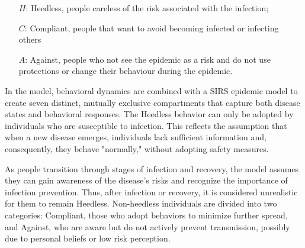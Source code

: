 \begin{itemize}
	\item[$H$:] Heedless, people careless of the risk associated with the infection;
	\item[$C$:] Compliant, people that want to avoid becoming infected or infecting others
	\item[$A$:] Against, people who not see the epidemic as a risk and do not use protections or change their behaviour during the epidemic. 
\end{itemize}

In the model, behavioral dynamics are combined with a SIRS epidemic model to create seven distinct, mutually exclusive compartments that capture both disease states and behavioral responses. The Heedless behavior can only be adopted by individuals who are susceptible to infection. This reflects the assumption that when a new disease emerges, individuals lack sufficient information and, consequently, they behave "normally," without adopting safety measures.

As people transition through stages of infection and recovery, the model assumes they can gain awareness of the disease's risks and recognize the importance of infection prevention. Thus, after infection or recovery, it is considered unrealistic for them to remain Heedless. Non-heedless individuals are divided into two categories: Compliant, those who adopt behaviors to minimize further spread, and Against, who are aware but do not actively prevent transmission, possibly due to personal beliefs or low risk perception. 

